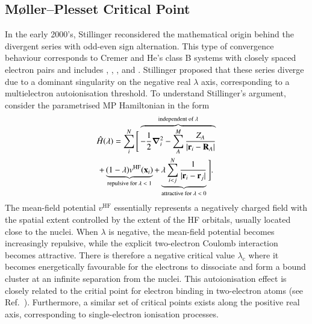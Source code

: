\documentclass[aps,prb,reprint,noshowkeys,superscriptaddress]{revtex4-1}
\newcommand{\Ne}{N} %
\newcommand{\Nn}{M} %
\newcommand{\hH}{\Hat{H}}
\newcommand{\lc}{\lambda_{\text{c}}}
\begin{document}
\subsection{M{\o}ller--Plesset Critical Point}
\label{sec:MP_critical_point}

In the early 2000's, Stillinger reconsidered the mathematical origin behind the divergent series with odd-even
sign alternation.\cite{Stillinger_2000} 
This type of convergence behaviour corresponds to Cremer and He's class B systems with closely spaced
electron pairs and includes , , , and .\cite{Cremer_1996}
Stillinger proposed that these series diverge due to a dominant singularity
on the negative real $\lambda$ axis, corresponding to a multielectron autoionisation threshold.\cite{Stillinger_2000}
To understand Stillinger's argument, consider the parametrised MP Hamiltonian in the form
\begin{multline}
\label{eq:HamiltonianStillinger}
    \hH(\lambda) = 
    \sum_{i}^{\Ne} \Bigg[ 
    \overbrace{-\frac{1}{2}\grad_i^2 
    - \sum_{A}^{\Nn} \frac{Z_A}{\abs{\vb{r}_i-\vb{R}_A}}}^{\text{independent of $\lambda$}}
    \\
    + \underbrace{(1-\lambda)v^{\text{HF}}(\vb{x}_i)}_{\text{repulsive for $\lambda < 1$}}
    + \underbrace{\lambda\sum_{i<j}^{\Ne}\frac{1}{|\vb{r}_i-\vb{r}_j|}}_{\text{attractive for $\lambda < 0$}}
    \Bigg].
\end{multline}
The mean-field potential $v^{\text{HF}}$ essentially represents a negatively charged field with the spatial extent
controlled by the extent of the HF orbitals, usually located close to the nuclei.
When $\lambda$ is negative, the mean-field potential becomes increasingly repulsive, while the explicit two-electron 
Coulomb interaction becomes attractive.
There is therefore a negative critical value $\lc$ where it becomes energetically favourable for the electrons 
to dissociate and form a bound cluster at an infinite separation from the nuclei.\cite{Stillinger_2000}
This autoionisation effect is closely related to the critial point for electron binding in two-electron 
atoms (see Ref.~).
Furthermore, a similar set of critical points exists along the positive real axis, corresponding to single-electron ionisation
processes.\cite{Sergeev_2005}
\end{document}
